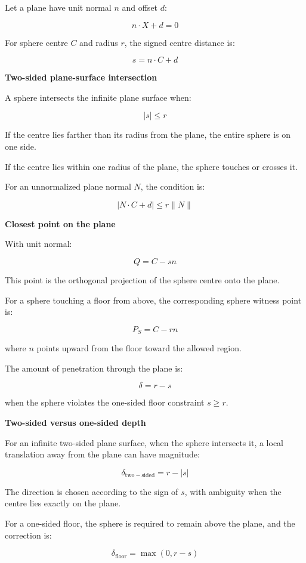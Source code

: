 Let a plane have unit normal \(n\) and offset \(d\):

\[
n\cdot X+d=0
\]

For sphere centre \(C\) and radius \(r\), the signed centre distance is:

\[
\boxed{ s=n\cdot C+d }
\]

\textbf{Two-sided plane-surface intersection}

A sphere intersects the infinite plane surface when:

\[
\boxed{ |s|\le r }
\]

If the centre lies farther than its radius from the plane, the entire sphere is on one side.

If the centre lies within one radius of the plane, the sphere touches or crosses it.

For an unnormalized plane normal \(N\), the condition is:

\[
\boxed{ |N\cdot C+d|\le r\|N\| }
\]

\textbf{Closest point on the plane}

With unit normal:

\[
\boxed{ Q=C-sn }
\]

This point is the orthogonal projection of the sphere centre onto the plane.

For a sphere touching a floor from above, the corresponding sphere witness point is:

\[
\boxed{ P_S=C-rn }
\]

where \(n\) points upward from the floor toward the allowed region.

The amount of penetration through the plane is:

\[
\boxed{ \delta=r-s }
\]

when the sphere violates the one-sided floor constraint \(s\ge r\).

\textbf{Two-sided versus one-sided depth}

For an infinite two-sided plane surface, when the sphere intersects it, a local translation away from the plane can have magnitude:

\[
\boxed{ \delta_{\mathrm{two-sided}}=r-|s| }
\]

The direction is chosen according to the sign of \(s\), with ambiguity when the centre lies exactly on the plane.

For a one-sided floor, the sphere is required to remain above the plane, and the correction is:

\[
\boxed{ \delta_{\mathrm{floor}}=\max(0,r-s) }
\]

